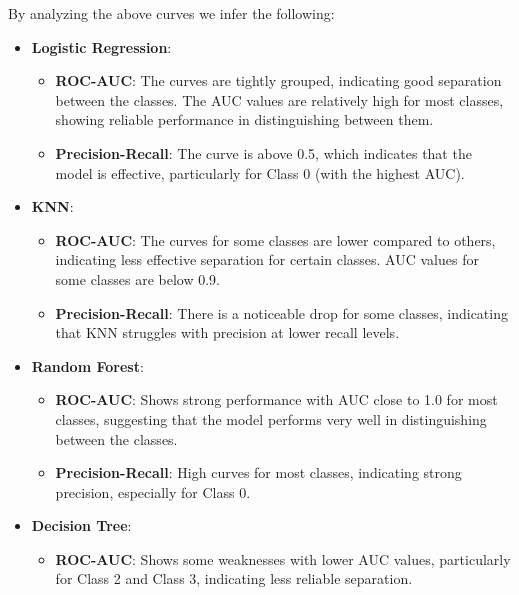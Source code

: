 \documentclass[12pt]{report}
\begin{document}
By analyzing the above curves we infer the following:
\vspace{-1.25em}
\begin{itemize}
	\setlength\itemsep{-1.5em}
		\item \textbf{Logistic Regression}:
		\vspace{-1.25em}	
		\begin{itemize}
					\setlength\itemsep{-1.5em}
					\item \textbf{ROC-AUC}: The curves are tightly grouped, indicating good separation between the classes. The AUC values are relatively high for most classes, showing reliable performance in distinguishing between them.
					\item \textbf{Precision-Recall}: The curve is above 0.5, which indicates that the model is effective, particularly for Class 0 (with the highest AUC).
			\end{itemize}
		\item \textbf{KNN}:
		\vspace{-1.25em}	
		\begin{itemize}
					\setlength\itemsep{-1.5em}
					\item \textbf{ROC-AUC}: The curves for some classes are lower compared to others, indicating less effective separation for certain classes. AUC values for some classes are below 0.9.
					\item \textbf{Precision-Recall}: There is a noticeable drop for some classes, indicating that KNN struggles with precision at lower recall levels.
				\end{itemize}
		\item \textbf{Random Forest}:
		\vspace{-1.25em}	
		\begin{itemize}
				\setlength\itemsep{-1.5em}
        \item \textbf{ROC-AUC}: Shows strong performance with AUC close to 1.0 for most classes, suggesting that the model performs very well in distinguishing between the classes.
        \item \textbf{Precision-Recall}: High curves for most classes, indicating strong precision, especially for Class 0.
			\end{itemize}
		\item \textbf{Decision Tree}:
		\vspace{-1.25em}	
		\begin{itemize}
				\setlength\itemsep{-1.5em}
        \item \textbf{ROC-AUC}: Shows some weaknesses with lower AUC values, particularly for Class 2 and Class 3, indicating less reliable separation.

\end{itemize}
\end{itemize}
\end{document}
